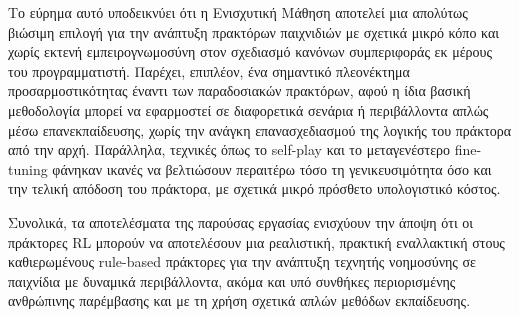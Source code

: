 \documentclass[12pt]{article}
\begin{document}
Το εύρημα αυτό υποδεικνύει ότι η Ενισχυτική Μάθηση αποτελεί μια απολύτως
βιώσιμη επιλογή για την ανάπτυξη πρακτόρων παιχνιδιών με σχετικά μικρό κόπο και
χωρίς εκτενή εμπειρογνωμοσύνη στον σχεδιασμό κανόνων συμπεριφοράς εκ μέρους
του προγραμματιστή. Παρέχει, επιπλέον, ένα σημαντικό πλεονέκτημα προσαρμοστικότητας
έναντι των παραδοσιακών πρακτόρων, αφού η ίδια βασική μεθοδολογία μπορεί να
εφαρμοστεί σε διαφορετικά σενάρια ή περιβάλλοντα απλώς μέσω επανεκπαίδευσης,
χωρίς την ανάγκη επανασχεδιασμού της λογικής του πράκτορα από την αρχή.
Παράλληλα, τεχνικές όπως το self-play και το μεταγενέστερο fine-tuning
φάνηκαν ικανές να βελτιώσουν περαιτέρω τόσο τη γενικευσιμότητα όσο και την
τελική απόδοση του πράκτορα, με σχετικά μικρό πρόσθετο υπολογιστικό κόστος.

Συνολικά, τα αποτελέσματα της παρούσας εργασίας ενισχύουν την άποψη ότι οι πράκτορες RL μπορούν να
αποτελέσουν μια ρεαλιστική, πρακτική εναλλακτική στους καθιερωμένους rule-based
πράκτορες για την ανάπτυξη τεχνητής νοημοσύνης σε παιχνίδια με δυναμικά περιβάλλοντα, ακόμα και υπό
συνθήκες περιορισμένης ανθρώπινης παρέμβασης και με τη χρήση σχετικά απλών μεθόδων εκπαίδευσης.

\pagebreak



\end{document}
